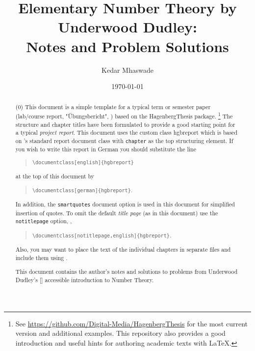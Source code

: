\documentclass[english,notitlepage,smartquotes]{hgbreport}
\theoremstyle{definition}
\theoremstyle{remark}
\theoremstyle{plain}
\begin{document}
\author{Kedar Mhaswade}                    %
\title{Elementary Number Theory by Underwood Dudley:\\ %
			Notes and Problem Solutions}	                 %
\date{\today}

\maketitle

\begin{abstract}\noindent
\if(0)
This document is a simple template for a typical term or semester paper
(lab/course report, "Übungsbericht", \etc) based on the \textsf{HagenbergThesis}
\latex package.%
\footnote{See \url{https://github.com/Digital-Media/HagenbergThesis} for the
	most current version and additional examples. This repository also provides
	a good introduction and useful hints for authoring academic texts with
	LaTeX.}
The structure and chapter titles have been formulated to provide a good
starting point for a typical \emph{project report}. This document uses the
custom class \textsf{hgbreport} which is based on \latex's standard
\textsf{report} document class with \texttt{chapter} as the top structuring
element. If you wish to write this report in German you should substitute the
line
%
\begin{quote}
	\verb!\documentclass[english]{hgbreport}! 
\end{quote}
%
at the top of this document by
%
\begin{quote}
	\verb!\documentclass[german]{hgbreport}!.
\end{quote}
%
In addition, the \texttt{smartquotes} document option is used in this document
for simplified insertion of quotes. To omit the default \emph{title page}
(as in this document) use the \texttt{notitlepage} option, \eg,
%
\begin{quote}
	\verb!\documentclass[notitlepage,english]{hgbreport}!.
\end{quote}
%
Also, you may want to place the text of the individual chapters in separate
files and include them using \verb!!.
\fi

\bigskip
\noindent
This document contains the author's notes and solutions to problems from Underwood Dudley's [\cite{Dudley2008}] accessible introduction to Number Theory.


\end{abstract}
\end{document}
